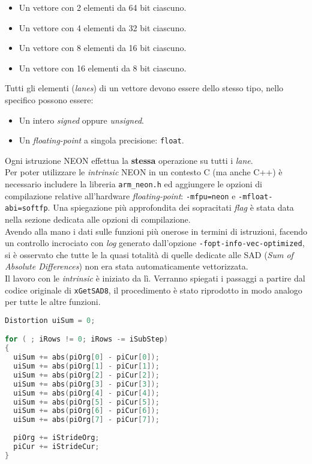 \begin{itemize}
  \item Un vettore con 2 elementi da 64 bit ciascuno.
  \item Un vettore con 4 elementi da 32 bit ciascuno.
  \item Un vettore con 8 elementi da 16 bit ciascuno.
  \item Un vettore con 16 elementi da 8 bit ciascuno.
\end{itemize}

Tutti gli elementi (\emph{lanes}) di un vettore devono essere dello stesso 
tipo, nello specifico possono essere:

\begin{itemize}
  \item Un intero \emph{signed} oppure \emph{unsigned}.
  \item Un \emph{floating-point} a singola precisione: \verb|float|.
\end{itemize}

Ogni istruzione NEON effettua la \textbf{stessa} operazione su tutti i 
\emph{lane}.\\

Per poter utilizzare le \emph{intrinsic} NEON in un contesto C (ma anche C++) è 
necessario includere la libreria \verb|arm_neon.h| ed aggiungere le opzioni di 
compilazione relative all'hardware \emph{floating-point}: \verb|-mfpu=neon| e 
\verb|-mfloat-abi=softfp|. Una spiegazione più approfondita dei sopracitati 
\emph{flag} è stata data nella sezione dedicata alle opzioni di compilazione.\\

Avendo alla mano i dati sulle funzioni più onerose in termini di istruzioni, 
facendo un controllo incrociato con \emph{log} generato dall'opzione 
\verb|-fopt-info-vec-optimized|, si è osservato che tutte le la quasi totalità 
di quelle dedicate alle SAD (\emph{Sum of Absolute Differences}) non era stata 
automaticamente vettorizzata.\\

Il lavoro con le \emph{intrinsic} è iniziato da lì. Verranno spiegati i 
passaggi a partire dal codice originale di \verb|xGetSAD8|, il procedimento è 
stato riprodotto in modo analogo per tutte le altre funzioni.\\

\begin{lstlisting}[language=C]
Distortion uiSum = 0;

for ( ; iRows != 0; iRows -= iSubStep)
{
  uiSum += abs(piOrg[0] - piCur[0]);
  uiSum += abs(piOrg[1] - piCur[1]);
  uiSum += abs(piOrg[2] - piCur[2]);
  uiSum += abs(piOrg[3] - piCur[3]);
  uiSum += abs(piOrg[4] - piCur[4]);
  uiSum += abs(piOrg[5] - piCur[5]);
  uiSum += abs(piOrg[6] - piCur[6]);
  uiSum += abs(piOrg[7] - piCur[7]);
  
  piOrg += iStrideOrg;
  piCur += iStrideCur;
}
\end{lstlisting}

